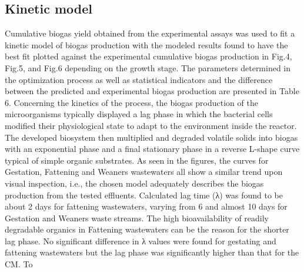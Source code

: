 \subsection{Kinetic model}
Cumulative biogas yield obtained from the experimental assays was used to fit a kinetic model of biogas production with the modeled results found to have the best fit plotted against the experimental cumulative biogas production in Fig.4, Fig.5, and Fig.6 depending on the growth stage. The parameters determined in the optimization process as well as statistical indicators and the difference between the predicted and experimental biogas production are presented in Table 6.
Concerning the kinetics of the process, the biogas production of the microorganisms typically displayed a lag phase in which the bacterial cells modified their physiological state to adapt to the environment inside the reactor. The developed biosystem then multiplied and degraded volatile solids into biogas with an exponential phase and a final stationary phase in a reverse L-shape curve typical of simple organic substrates. As seen in the figures, the curves for Gestation, Fattening and Weaners wastewaters all show a similar trend upon visual inspection, i.e., the chosen model adequately describes the biogas production from the tested effluents. Calculated lag time (λ) was found to be about 2 days for fattening wastewaters, varying from 6 and almost 10 days for Gestation and Weaners waste streams. The high bioavailability of readily degradable organics in Fattening wastewaters can be the reason for the shorter lag phase. No significant difference in λ values were found for gestating and fattening wastewaters but the lag phase  was significantly higher than that for the CM. To